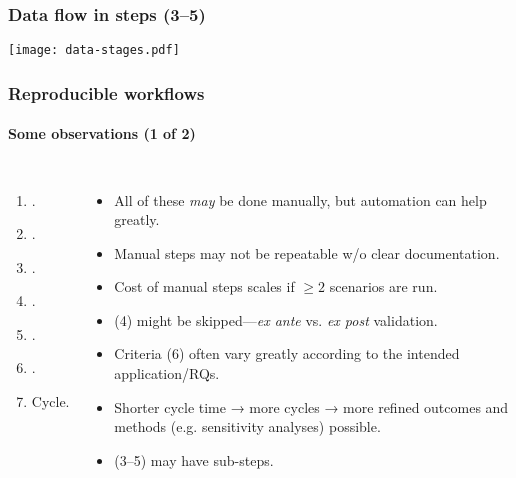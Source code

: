 \documentclass[12pt,aspectratio=169]{beamer}
\begin{document}
\begin{frame}
  \frametitle{Data flow in steps (3–5)}
  \hspace*{-10mm}\texttt{[image: data-stages.pdf]}
\end{frame}

\begin{frame}
\frametitle{Reproducible workflows}
\framesubtitle{Some observations (1 of 2)}

\begin{columns}[T]
\begin{enumerate}
  \item {}.
  \item {}.
  \item {}.
  \item {}.
  \item {}.
  \item {}.
  \item Cycle.
\end{enumerate}

\begin{itemize}
  \item All of these \emph{may} be done manually, but automation can help greatly.
  \item Manual steps may not be repeatable w/o clear documentation.
  \item Cost of manual steps scales if $\geq 2$ scenarios are run.
  \item (4) might be skipped—\emph{ex ante} vs. \emph{ex post} validation.
  \item Criteria (6) often vary greatly according to the intended application/RQs.
  \item Shorter cycle time → more cycles → more refined outcomes and methods (e.g. sensitivity analyses) possible.
  \item (3–5) may have sub-steps.
\end{itemize}

\end{columns}
\end{frame}
\end{document}
